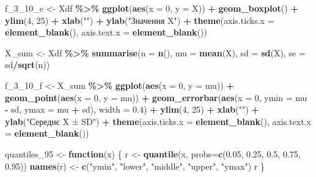 \documentclass[
  11pt,
]{book}
\newenvironment{Shaded}{\begin{snugshade}}{\end{snugshade}}
\newcommand{\AttributeTok}[1]{\textcolor[rgb]{0.13,0.29,0.53}{#1}}
\newcommand{\ControlFlowTok}[1]{\textcolor[rgb]{0.13,0.29,0.53}{\textbf{#1}}}
\newcommand{\DecValTok}[1]{\textcolor[rgb]{0.00,0.00,0.81}{#1}}
\newcommand{\FloatTok}[1]{\textcolor[rgb]{0.00,0.00,0.81}{#1}}
\newcommand{\FunctionTok}[1]{\textcolor[rgb]{0.13,0.29,0.53}{\textbf{#1}}}
\newcommand{\NormalTok}[1]{#1}
\newcommand{\OtherTok}[1]{\textcolor[rgb]{0.56,0.35,0.01}{#1}}
\newcommand{\SpecialCharTok}[1]{\textcolor[rgb]{0.81,0.36,0.00}{\textbf{#1}}}
\newcommand{\StringTok}[1]{\textcolor[rgb]{0.31,0.60,0.02}{#1}}
\begin{document}
\begin{Shaded}
\begin{Highlighting}[]
\NormalTok{f\_3\_10\_e }\OtherTok{\textless{}{-}}\NormalTok{ Xdf }\SpecialCharTok{\%\textgreater{}\%} 
  \FunctionTok{ggplot}\NormalTok{(}\FunctionTok{aes}\NormalTok{(}\AttributeTok{x =} \DecValTok{0}\NormalTok{, }\AttributeTok{y =}\NormalTok{ X)) }\SpecialCharTok{+}
  \FunctionTok{geom\_boxplot}\NormalTok{() }\SpecialCharTok{+}
  \FunctionTok{ylim}\NormalTok{(}\DecValTok{4}\NormalTok{, }\DecValTok{25}\NormalTok{) }\SpecialCharTok{+}
  \FunctionTok{xlab}\NormalTok{(}\StringTok{""}\NormalTok{) }\SpecialCharTok{+} \FunctionTok{ylab}\NormalTok{(}\StringTok{"Значення X"}\NormalTok{) }\SpecialCharTok{+}
  \FunctionTok{theme}\NormalTok{(}\AttributeTok{axis.ticks.x =} \FunctionTok{element\_blank}\NormalTok{(),}
        \AttributeTok{axis.text.x =} \FunctionTok{element\_blank}\NormalTok{())}

\NormalTok{X\_sum }\OtherTok{\textless{}{-}}\NormalTok{ Xdf }\SpecialCharTok{\%\textgreater{}\%}
  \FunctionTok{summarise}\NormalTok{(}\AttributeTok{n =} \FunctionTok{n}\NormalTok{(), }\AttributeTok{mu =} \FunctionTok{mean}\NormalTok{(X), }\AttributeTok{sd =} \FunctionTok{sd}\NormalTok{(X), }\AttributeTok{se =}\NormalTok{ sd}\SpecialCharTok{/}\FunctionTok{sqrt}\NormalTok{(n))}

\NormalTok{f\_3\_10\_f }\OtherTok{\textless{}{-}}\NormalTok{ X\_sum }\SpecialCharTok{\%\textgreater{}\%} 
  \FunctionTok{ggplot}\NormalTok{(}\FunctionTok{aes}\NormalTok{(}\AttributeTok{x =} \DecValTok{0}\NormalTok{, }\AttributeTok{y =}\NormalTok{ mu)) }\SpecialCharTok{+} 
  \FunctionTok{geom\_point}\NormalTok{(}\FunctionTok{aes}\NormalTok{(}\AttributeTok{x =} \DecValTok{0}\NormalTok{, }\AttributeTok{y =}\NormalTok{ mu)) }\SpecialCharTok{+}
  \FunctionTok{geom\_errorbar}\NormalTok{(}\FunctionTok{aes}\NormalTok{(}\AttributeTok{x =} \DecValTok{0}\NormalTok{, }\AttributeTok{ymin =}\NormalTok{ mu }\SpecialCharTok{{-}}\NormalTok{ sd, }\AttributeTok{ymax =}\NormalTok{ mu }\SpecialCharTok{+}\NormalTok{ sd), }
                \AttributeTok{width =} \FloatTok{0.4}\NormalTok{) }\SpecialCharTok{+}
  \FunctionTok{ylim}\NormalTok{(}\DecValTok{4}\NormalTok{, }\DecValTok{25}\NormalTok{) }\SpecialCharTok{+}
  \FunctionTok{xlab}\NormalTok{(}\StringTok{""}\NormalTok{) }\SpecialCharTok{+} \FunctionTok{ylab}\NormalTok{(}\StringTok{"Середнє X ± SD"}\NormalTok{) }\SpecialCharTok{+}
  \FunctionTok{theme}\NormalTok{(}\AttributeTok{axis.ticks.x =} \FunctionTok{element\_blank}\NormalTok{(),}
        \AttributeTok{axis.text.x =} \FunctionTok{element\_blank}\NormalTok{())}

\NormalTok{quantiles\_95 }\OtherTok{\textless{}{-}} \ControlFlowTok{function}\NormalTok{(x) \{}
\NormalTok{  r }\OtherTok{\textless{}{-}} \FunctionTok{quantile}\NormalTok{(x, }\AttributeTok{probs=}\FunctionTok{c}\NormalTok{(}\FloatTok{0.05}\NormalTok{, }\FloatTok{0.25}\NormalTok{, }\FloatTok{0.5}\NormalTok{, }\FloatTok{0.75}\NormalTok{, }\FloatTok{0.95}\NormalTok{))}
  \FunctionTok{names}\NormalTok{(r) }\OtherTok{\textless{}{-}} \FunctionTok{c}\NormalTok{(}\StringTok{"ymin"}\NormalTok{, }\StringTok{"lower"}\NormalTok{, }\StringTok{"middle"}\NormalTok{, }\StringTok{"upper"}\NormalTok{, }\StringTok{"ymax"}\NormalTok{)}
\NormalTok{  r}
\NormalTok{\}}


\end{Highlighting}
\end{Shaded}
\end{document}
